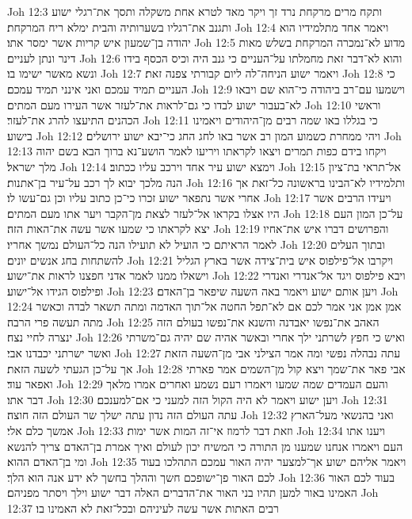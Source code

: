 Joh 12:3  ותקח מרים מרקחת נרד זך ויקר מאד לטרא אחת משקלה ותסך את־רגלי ישוע ותגנב את־רגליו בשערותיה והבית ימלא ריח המרקחת׃
Joh 12:4  ויאמר אחד מתלמידיו הוא יהודה בן־שמעון איש קריות אשר ימסר אתו׃
Joh 12:5  מדוע לא־נמכרה המרקחת בשלש מאות דינר ונתן לעניים׃
Joh 12:6  והוא לא־דבר זאת מחמלתו על־העניים כי גנב היה וכיס הכסף בידו ונשא מאשר ישימו בו׃
Joh 12:7  ויאמר ישוע הניחה־לה ליום קבורתי צפנה זאת׃
Joh 12:8  כי העניים תמיד עמכם ואני אינני תמיד עמכם׃
Joh 12:9  וישמעו עם־רב ביהודה כי־הוא שם ויבאו לא־בעבור ישוע לבדו כי גם־לראות את־לעזר אשר העירו מעם המתים׃
Joh 12:10  וראשי הכהנים התיעצו להרג את־לעזר׃
Joh 12:11  כי בגללו באו שמה רבים מן־היהודים ויאמינו בישוע׃
Joh 12:12  ויהי ממחרת כשמוע המון רב אשר באו לחג החג כי־יבא ישוע ירושלים׃
Joh 12:13  ויקחו בידם כפות תמרים ויצאו לקראתו ויריעו לאמר הושע־נא ברוך הבא בשם יהוה מלך ישראל׃
Joh 12:14  וימצא ישוע עיר אחד וירכב עליו ככתוב׃
Joh 12:15  אל־תראי בת־ציון הנה מלכך יבוא לך רכב על־עיר בן־אתנות׃
Joh 12:16  ותלמידיו לא־הבינו בראשונה כל־זאת אך אחרי אשר נתפאר ישוע זכרו כי־כן כתוב עליו וכן גם־עשו לו׃
Joh 12:17  ויעידו הרבים אשר היו אצלו בקראו אל־לעזר לצאת מן־הקבר ויער אתו מעם המתים׃
Joh 12:18  על־כן המון העם יצא לקראתו כי שמעו אשר עשה את־האות הזה׃
Joh 12:19  והפרושים דברו איש את־אחיו לאמר הראיתם כי הועיל לא תועילו הנה כל־העולם נמשך אחריו׃
Joh 12:20  ובתוך העלים להשתחות בחג אנשים יונים׃
Joh 12:21  ויקרבו אל־פילפוס איש בית־צידה אשר בארץ הגליל וישאלו ממנו לאמר אדני חפצנו לראות את־ישוע׃
Joh 12:22  ויבא פילפוס ויגד אל־אנדרי ואנדרי ופילפוס הגידו אל־ישוע׃
Joh 12:23  ויען אותם ישוע ויאמר באה השעה שיפאר בן־האדם׃
Joh 12:24  אמן אמן אני אמר לכם אם לא־תפל החטה אל־תוך האדמה ומתה תשאר לבדה וכאשר מתה תעשה פרי הרבה׃
Joh 12:25  האהב את־נפשו יאבדנה והשנא את־נפשו בעולם הזה ינצרה לחיי נצח׃
Joh 12:26  ואיש כי חפץ לשרתני ילך אחרי ובאשר אהיה שם יהיה גם־משרתי ואשר ישרתני יכבדנו אבי׃
Joh 12:27  עתה נבהלה נפשי ומה אמר הצילני אבי מן־השעה הזאת אך על־כן הגעתי לשעה הזאת׃
Joh 12:28  אבי פאר את־שמך ויצא קול מן־השמים אמר פארתי ואפאר עוד׃
Joh 12:29  והעם העמדים שמה שמעו ויאמרו רעם נשמע ואחרים אמרו מלאך דבר אתו׃
Joh 12:30  ויען ישוע ויאמר לא היה הקול הזה למעני כי אם־למענכם׃
Joh 12:31  עתה העולם הזה נדון עתה ישלך שר העולם הזה חוצה׃
Joh 12:32  ואני בהנשאי מעל־הארץ אמשך כלם אלי׃
Joh 12:33  וזאת דבר לרמוז אי־זה המות אשר ימות׃
Joh 12:34  ויענו אתו העם ויאמרו אנחנו שמענו מן התורה כי המשיח יכון לעולם ואיך אמרת בן־האדם צריך להנשא ומי בן־האדם ההוא׃
Joh 12:35  ויאמר אליהם ישוע אך־למצער יהיה האור עמכם התהלכו בעוד לכם האור פן־ישופכם חשך וההלך בחשך לא ידע אנה הוא הלך׃
Joh 12:36  בעוד לכם האור האמינו באור למען תהיו בני האור את־הדברים האלה דבר ישוע וילך ויסתר מפניהם׃
Joh 12:37  רבים האתות אשר עשה לעיניהם ובכל־זאת לא האמינו בו׃
